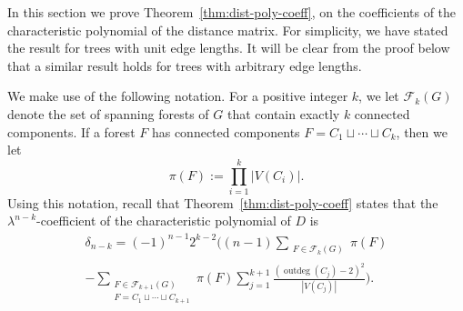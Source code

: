 \documentclass[12pt]{amsart}
\theoremstyle{definition}
\newcommand{\forests}{\mathcal{F}}
\DeclareMathOperator{\outdeg}{outdeg}
\begin{document}
In this section we prove Theorem~\ref{thm:dist-poly-coeff}, on the coefficients of the characteristic polynomial of the distance matrix.
For simplicity, we have stated the result for trees with unit edge lengths. 
It will be clear from the proof below that a similar result holds for trees with arbitrary edge lengths. 

We make use of the following notation.
For a positive integer $k$, we let $\forests_k(G)$ denote the set of spanning forests of $G$ that contain exactly $k$ connected components.
If a forest $F$ has connected components $F = C_1 \sqcup \cdots \sqcup C_k$, then we let
\[
	\pi(F) := \prod_{i = 1}^k |V(C_i)|.
\]
Using this notation, recall that Theorem~\ref{thm:dist-poly-coeff} states that the $\lambda^{n - k}$-coefficient of the characteristic polynomial of $D$ is
\begin{multline}\label{eq:dist-poly-coeff}
	\delta_{n - k}
	= (-1)^{n - 1} 2^{k - 2} \bigg((n - 1) \sum_{\substack{F \in \mathcal F_{k}(G) }} \pi(F) 
	\\ - \sum_{\substack{F \in \mathcal F_{k + 1}(G) \\ F = C_1 \sqcup \cdots \sqcup C_{k + 1}}} \!\!\! \pi(F) \sum_{j = 1}^{k + 1}  \frac{(\outdeg(C_j) - 2)^2}{|V(C_j)|}\bigg) .
\end{multline}
\end{document}
